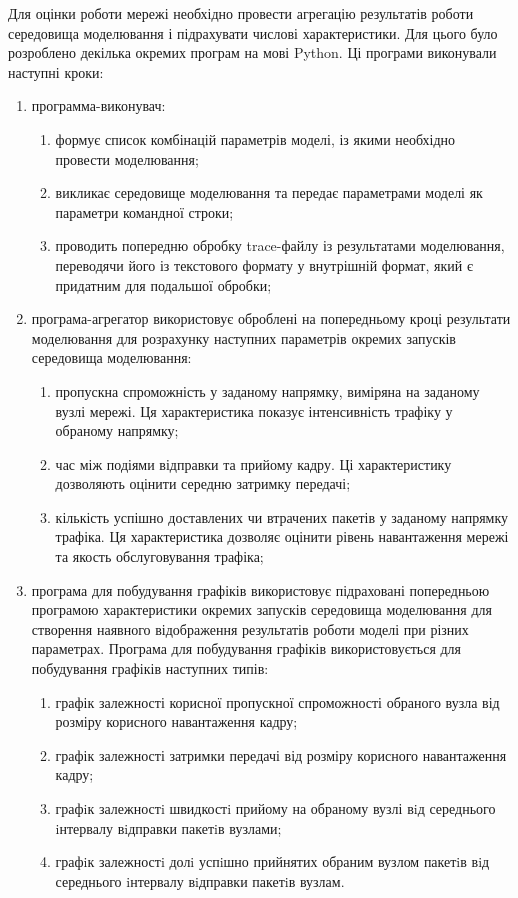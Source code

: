 \documentclass[a4paper,ukrainian,utf8,nocolumnsxix,floatsection,equationsection]{eskdtext}
\begin{document}
Для оцінки роботи мережі необхідно провести агрегацію результатів роботи середовища моделювання і підрахувати числові характеристики. Для цього було розроблено декілька окремих програм на мові Python. Ці програми виконували наступні кроки:
\begin{enumerate}
	\item программа-виконувач:
	\begin{enumerate}
		\item формує список комбінацій параметрів моделі, із якими необхідно провести моделювання;
		\item викликає середовище моделювання та передає параметрами моделі як параметри командної строки;
		\item проводить попередню обробку trace-файлу із результатами моделювання, переводячи його із текстового формату у внутрішній формат, який є придатним для подальшої обробки;
	\end{enumerate}

	\item програма-агрегатор використовує оброблені на попередньому кроці результати моделювання для розрахунку наступних параметрів окремих запусків середовища моделювання:
	\begin{enumerate}
		\item пропускна спроможність у заданому напрямку, виміряна на заданому вузлі мережі. Ця характеристика показує інтенсивність трафіку у обраному напрямку;
		\item час між подіями відправки та прийому кадру. Ці характеристику дозволяють оцінити середню затримку передачі;
		\item кількість успішно доставлених чи втрачених пакетів у заданому напрямку трафіка. Ця характеристика дозволяє оцінити рівень навантаження мережі та якость обслуговування трафіка;
	\end{enumerate}

	\item програма для побудування графіків використовує підраховані попередньою програмою характеристики окремих запусків середовища моделювання для створення наявного відображення результатів роботи моделі при різних параметрах. Програма для побудування графіків використовується для побудування графіків наступних типів:
	\begin{enumerate}
		\item графік залежності корисної пропускної спроможності обраного вузла від розміру корисного навантаження кадру;
		\item графік залежності затримки передачі від розміру корисного навантаження кадру;
		\item графiк залежностi швидкостi прийому на обраному вузлі вiд середнього iнтервалу вiдправки пакетiв вузлами;
		\item графiк залежностi долi успiшно прийнятих обраним вузлом пакетiв вiд середнього iнтервалу вiдправки пакетiв вузлам.
	\end{enumerate}
\end{enumerate}
\end{document}
